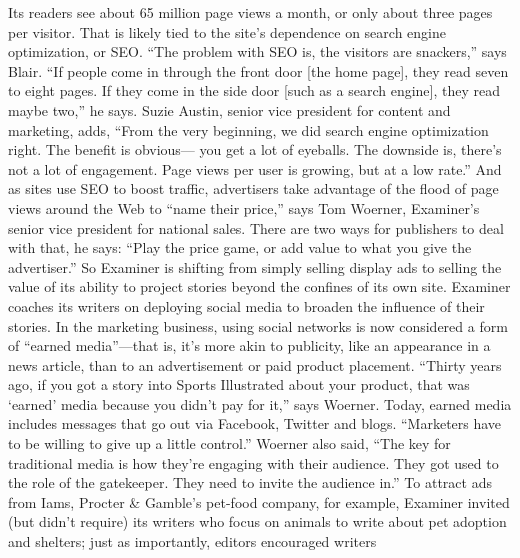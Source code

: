 Its readers see about 65 million page views a month, or only about three pages
per visitor. That is likely tied to the site’s dependence on search engine optimization,
or SEO.
``The problem with SEO is, the visitors are snackers,'' says Blair. ``If people
come in through the front door [the home page], they read seven to eight pages.
If they come in the side door [such as a search engine], they read maybe two,'' he
says. Suzie Austin, senior vice president for content and marketing, adds, ``From
the very beginning, we did search engine optimization right. The benefit is obvious—
you get a lot of eyeballs. The downside is, there’s not a lot of engagement.
Page views per user is growing, but at a low rate.'' And as sites use SEO to boost
traffic, advertisers take advantage of the flood of page views around the Web to
``name their price,'' says Tom Woerner, Examiner’s senior vice president for national
sales. There are two ways for publishers to deal with that, he says: ``Play the
price game, or add value to what you give the advertiser.''
So Examiner is shifting from simply selling display ads to selling the value of its
ability to project stories beyond the confines of its own site. Examiner coaches its
writers on deploying social media to broaden the influence of their stories. In the
marketing business, using social networks is now considered a form of ``earned
media''—that is, it’s more akin to publicity, like an appearance in a news article,
than to an advertisement or paid product placement. ``Thirty years ago, if you got
a story into Sports Illustrated about your product, that was ‘earned’ media because
you didn’t pay for it,'' says Woerner. Today, earned media includes messages
that go out via Facebook, Twitter and blogs. ``Marketers have to be willing to
give up a little control.'' Woerner also said, ``The key for traditional media is how
they’re engaging with their audience. They got used to the role of the gatekeeper.
They need to invite the audience in.''
To attract ads from Iams, Procter & Gamble’s pet-food company, for example,
Examiner invited (but didn’t require) its writers who focus on animals to write
about pet adoption and shelters; just as importantly, editors encouraged writers

